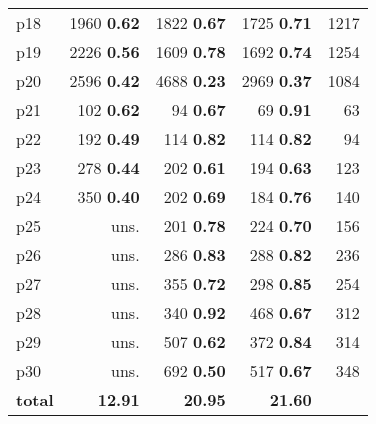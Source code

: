 \begin{tabular}{|l|rrr|r|}
p18 & {\footnotesize 1960} \textbf{0.62} & {\footnotesize 1822} \textbf{0.67} & {\footnotesize 1725} \textbf{0.71} & 1217\\
p19 & {\footnotesize 2226} \textbf{0.56} & {\footnotesize 1609} \textbf{0.78} & {\footnotesize 1692} \textbf{0.74} & 1254\\
p20 & {\footnotesize 2596} \textbf{0.42} & {\footnotesize 4688} \textbf{0.23} & {\footnotesize 2969} \textbf{0.37} & 1084\\
p21 & {\footnotesize 102} \textbf{0.62} & {\footnotesize 94} \textbf{0.67} & {\footnotesize 69} \textbf{0.91} & 63\\
p22 & {\footnotesize 192} \textbf{0.49} & {\footnotesize 114} \textbf{0.82} & {\footnotesize 114} \textbf{0.82} & 94\\
p23 & {\footnotesize 278} \textbf{0.44} & {\footnotesize 202} \textbf{0.61} & {\footnotesize 194} \textbf{0.63} & 123\\
p24 & {\footnotesize 350} \textbf{0.40} & {\footnotesize 202} \textbf{0.69} & {\footnotesize 184} \textbf{0.76} & 140\\
p25 & uns. & {\footnotesize 201} \textbf{0.78} & {\footnotesize 224} \textbf{0.70} & 156\\
p26 & uns. & {\footnotesize 286} \textbf{0.83} & {\footnotesize 288} \textbf{0.82} & 236\\
p27 & uns. & {\footnotesize 355} \textbf{0.72} & {\footnotesize 298} \textbf{0.85} & 254\\
p28 & uns. & {\footnotesize 340} \textbf{0.92} & {\footnotesize 468} \textbf{0.67} & 312\\
p29 & uns. & {\footnotesize 507} \textbf{0.62} & {\footnotesize 372} \textbf{0.84} & 314\\
p30 & uns. & {\footnotesize 692} \textbf{0.50} & {\footnotesize 517} \textbf{0.67} & 348\\
\hline
\textbf{total} & \textbf{12.91} & \textbf{20.95} & \textbf{21.60} & \\
\hline
\end{tabular}

